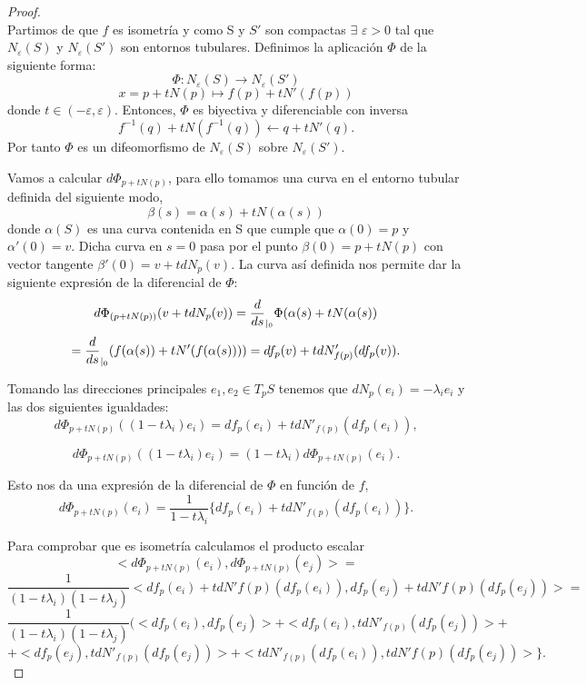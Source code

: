 \begin{proof}
	${ }$\\
	
	Partimos de que $f$ es isometría y como S y $S'$ son compactas $\exists$ $\varepsilon > 0$ tal que $N_\varepsilon(S)$ y $N_\varepsilon(S')$ son entornos tubulares. Definimos la aplicación $\Phi$ de la siguiente forma:
	\[
	\Phi : N_\varepsilon(S) \longrightarrow N_\varepsilon(S')
	\]
	\[
	x = p + tN(p) \longmapsto f(p) + tN'(f(p))
	\]
	donde $t \in (-\varepsilon, \varepsilon)$. Entonces, $\Phi$ es biyectiva y diferenciable con inversa
	\[
	f^{-1}(q) + tN(f^{-1}(q)) \longleftarrow q + tN'(q).
	\]
	Por tanto $\Phi$ es un difeomorfismo de $N_\varepsilon(S)$ sobre $N_\varepsilon(S')$.
	
	${ }$\\	
	
	Vamos a calcular $d\Phi_{p+tN(p)}$, para ello tomamos una curva en el entorno tubular definida del siguiente modo,
	\[
	\beta(s) = \alpha(s) + tN(\alpha(s))
	\]
	donde $\alpha(S)$ es una curva contenida en S que cumple que $\alpha(0) = p$ y $\alpha'(0) = v$. Dicha curva en $s = 0$ pasa por el punto $\beta(0) = p + tN(p)$  con vector tangente $\beta'(0) = v + tdN_p(v)$. La curva así definida nos permite dar la siguiente expresión de la diferencial de $\Phi$:
	\[
	d\Phi_{(p + tN(p))}(v + tdN_p(v)) = \frac{d}{ds}_{\arrowvert_0} \Phi(\alpha(s) + tN(\alpha(s))
	\]
	\[
	= \frac{d}{ds}_{\arrowvert_0} (f(\alpha(s)) + tN'(f(\alpha(s)))) = df_p(v) + tdN'_{f(p)}(df_p(v)).
	\]
	
	
	${ }$\\	
	
	Tomando las direcciones principales ${e_1, e_2} \in T_p S$ tenemos que $dN_p(e_i) = -\lambda_ie_i$ y las dos siguientes igualdades:
	\[
	d\Phi_{p + tN(p)}((1 - t\lambda_i)e_i) = df_p(e_i) + tdN'_{f(p)}(df_p(e_i)),
	\]
	
	\[
	d\Phi_{p + tN(p)}((1 - t\lambda_i)e_i) = (1 - t\lambda_i)d\Phi_{p + tN(p)}(e_i).
	\]
	
	Esto nos da una expresión de la diferencial de $\Phi$ en función de $f$,
	\[
	d\Phi_{p + tN(p)}(e_i) = \frac{1}{1 - t\lambda_i} \{df_p(e_i) + tdN'_{f(p)}(df_p(e_i))\}.
	\]
	
	Para comprobar que es isometría calculamos el producto escalar
	\[
	<d\Phi_{p + tN(p)}(e_i), d\Phi_{p + tN(p)}(e_j)> = 
	\]
	\[
	\frac{1}{(1 - t\lambda_i)(1 - t\lambda_j)}<df_p(e_i) + tdN'{f(p)}(df_p(e_i)), df_p(e_j) + tdN'{f(p)}(df_p(e_j))> =
	\]
	\[
	\frac{1}{(1 - t\lambda_i)(1 - t\lambda_j)}(<df_p(e_i), df_p(e_j)> + <df_p(e_i), tdN'_{f(p)}(df_p(e_j))> + 
	\]
	\[
	+ <df_p(e_j), tdN'_{f(p)}(df_p(e_j))> + <tdN'_{f(p)}(df_p(e_i)), tdN'{f(p)}(df_p(e_j))>\}.
	\]
	

\end{proof}
